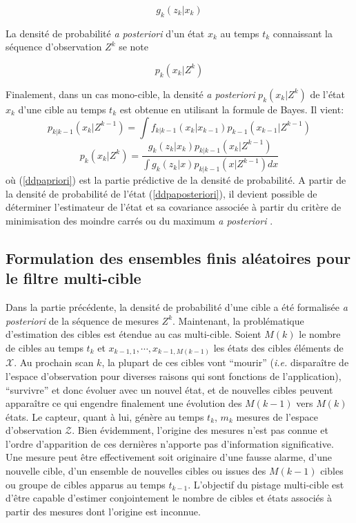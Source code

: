 \documentclass[10pt,french,a4paper]{report}
\begin{document}
\begin{equation}
 g_k(z_{k}|x_{k})
 \label{g}
\end{equation}

La densité de probabilité \textit{a posteriori} d'un état $x_{k}$ au temps $t_k$ connaissant la séquence d'observation $Z^k$ se note 

\begin{equation}
 p_k(x_{k}|Z^{k})
\end{equation}

Finalement, dans un cas mono-cible, la densité \textit{a posteriori} $p_k(x_k|Z^k)$ de l'état $x_{k}$ d'une cible au temps $t_{k}$ est obtenue en utilisant la formule de Bayes. Il vient: 
\begin{equation}
\label{ddpapriori}
p_{k|k-1}(x_k|Z^{k-1})=\int{ f_{k|k-1}(x_{k}|x_{k-1})  p_{k-1}(x_{k-1}|Z^{k-1})}
\end{equation}
\begin{equation}
\label{ddpaposteriori}
  p_k(x_{k}|Z^{k})=\frac{{g_k(z_{k}|x_{k}) p_{k|k-1}(x_k|Z^{k-1})}} {\int{g_k(z_{k}|x) p_{k|k-1}(x|Z^{k-1})  dx}}
\end{equation}
où (\ref{ddpapriori}) est la partie prédictive de la densité de probabilité. A partir de la densité de probabilité de l'état (\ref{ddpaposteriori}), il devient possible de déterminer l'estimateur de l'état et sa covariance associée à partir du critère de minimisation des moindre carrés ou du maximum \textit{a posteriori} \cite{BarShalom88}.   


%
\subsection{Formulation des ensembles finis aléatoires pour le filtre multi-cible}
\label{p2}
Dans la partie précédente, la densité de probabilité d'une cible a été formalisée \textit{a posteriori} de la séquence de mesures $Z^k$. Maintenant, la problématique d'estimation des cibles est étendue au cas multi-cible. Soient $M(k)$ le nombre de cibles au temps $t_k$ et $x_{k-1,1},\cdots, x_{k-1,M(k-1)}$ les états des cibles éléments de $\mathcal{X}$. Au prochain scan $k$, la plupart de ces cibles vont ``mourir'' (\textit{i.e.} disparaître de l'espace d'observation pour diverses raisons qui sont fonctions de l'application), ``survivre'' et donc évoluer avec un nouvel état, et de nouvelles cibles peuvent apparaître ce qui engendre finalement une évolution des $M(k-1)$ vers $M(k)$ états. Le capteur, quant à lui, génère au temps $t_k$, $m_k$ mesures de l'espace d'observation $\mathcal{Z}$. Bien évidemment, l'origine des mesures n'est pas connue et l'ordre d'apparition de ces dernières n'apporte pas d'information significative. Une mesure peut être effectivement soit originaire d'une fausse alarme, d'une nouvelle cible, d'un ensemble de nouvelles cibles ou issues des $M(k-1)$ cibles ou groupe de cibles apparus au temps $t_{k-1}$. L'objectif du pistage multi-cible est d'être capable d'estimer conjointement le nombre de cibles et états associés à partir des mesures dont l'origine est inconnue. 
\\
\end{document}
